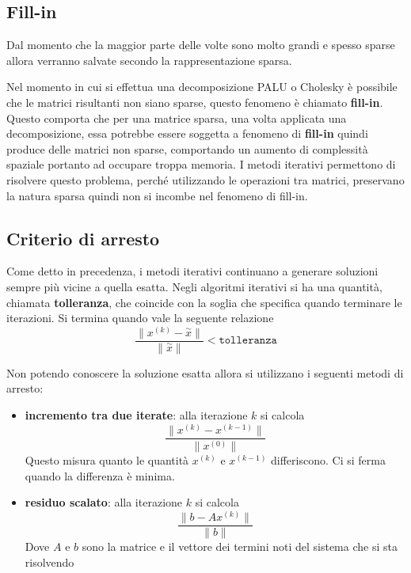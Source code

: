 \subsection{Fill-in}
Dal momento che la maggior parte delle volte sono molto grandi e spesso sparse 
allora verranno salvate secondo la rappresentazione sparsa. 

Nel momento in cui si effettua una decomposizione PALU o Cholesky è possibile che 
le matrici risultanti non siano sparse, questo fenomeno è chiamato \textbf{fill-in}.
Questo comporta che per una matrice sparsa, una volta applicata una decomposizione,
essa potrebbe essere soggetta a fenomeno di \textbf{fill-in} quindi produce 
delle matrici non sparse, comportando un aumento di complessità spaziale portanto 
ad occupare troppa memoria. I metodi iterativi permettono di risolvere questo problema,
perché utilizzando le operazioni tra matrici, preservano la natura sparsa quindi 
non si incombe nel fenomeno di fill-in.

\subsection{Criterio di arresto}
Come detto in precedenza, i metodi iterativi continuano a generare soluzioni sempre 
più vicine a quella esatta. 
Negli algoritmi iterativi si ha una quantità, chiamata \textbf{tolleranza}, che
coincide con la soglia che specifica quando terminare le iterazioni. Si termina 
quando vale la seguente relazione
$$\frac{\|x^{(k)}-\stackrel{\sim}{x}\|}{\|\stackrel{\sim}{x}\|} < \texttt{tolleranza}$$

Non potendo conoscere la soluzione esatta allora si utilizzano i seguenti metodi 
di arresto:
\begin{itemize}
    \item \textbf{incremento tra due iterate}: alla iterazione $k$ si calcola
    $$\frac{\|x^{(k)}-x^{(k-1)}\|}{\|x^{(0)}\|}$$
    Questo misura quanto le quantità $x^{(k)}$ e $x^{(k-1)}$ differiscono. Ci si 
    ferma quando la differenza è minima.
    \item \textbf{residuo scalato}: alla iterazione $k$ si calcola
    $$\frac{\|b- Ax^{(k)}\|}{\|b\|}$$
    Dove $A$ e $b$ sono la matrice e il vettore dei termini noti del sistema che 
    si sta risolvendo
\end{itemize}